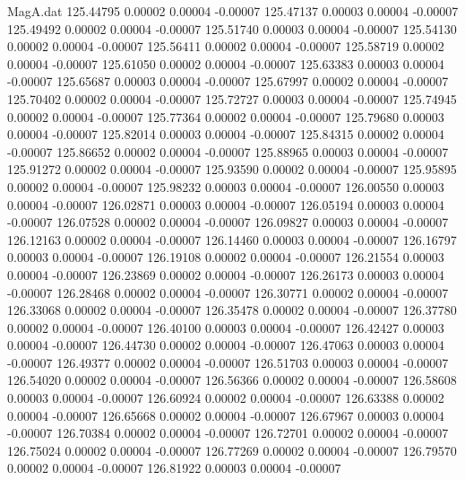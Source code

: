 \begin{filecontents}{MagA.dat}
 125.44795    0.00002    0.00004   -0.00007
 125.47137    0.00003    0.00004   -0.00007
 125.49492    0.00002    0.00004   -0.00007
 125.51740    0.00003    0.00004   -0.00007
 125.54130    0.00002    0.00004   -0.00007
 125.56411    0.00002    0.00004   -0.00007
 125.58719    0.00002    0.00004   -0.00007
 125.61050    0.00002    0.00004   -0.00007
 125.63383    0.00003    0.00004   -0.00007
 125.65687    0.00003    0.00004   -0.00007
 125.67997    0.00002    0.00004   -0.00007
 125.70402    0.00002    0.00004   -0.00007
 125.72727    0.00003    0.00004   -0.00007
 125.74945    0.00002    0.00004   -0.00007
 125.77364    0.00002    0.00004   -0.00007
 125.79680    0.00003    0.00004   -0.00007
 125.82014    0.00003    0.00004   -0.00007
 125.84315    0.00002    0.00004   -0.00007
 125.86652    0.00002    0.00004   -0.00007
 125.88965    0.00003    0.00004   -0.00007
 125.91272    0.00002    0.00004   -0.00007
 125.93590    0.00002    0.00004   -0.00007
 125.95895    0.00002    0.00004   -0.00007
 125.98232    0.00003    0.00004   -0.00007
 126.00550    0.00003    0.00004   -0.00007
 126.02871    0.00003    0.00004   -0.00007
 126.05194    0.00003    0.00004   -0.00007
 126.07528    0.00002    0.00004   -0.00007
 126.09827    0.00003    0.00004   -0.00007
 126.12163    0.00002    0.00004   -0.00007
 126.14460    0.00003    0.00004   -0.00007
 126.16797    0.00003    0.00004   -0.00007
 126.19108    0.00002    0.00004   -0.00007
 126.21554    0.00003    0.00004   -0.00007
 126.23869    0.00002    0.00004   -0.00007
 126.26173    0.00003    0.00004   -0.00007
 126.28468    0.00002    0.00004   -0.00007
 126.30771    0.00002    0.00004   -0.00007
 126.33068    0.00002    0.00004   -0.00007
 126.35478    0.00002    0.00004   -0.00007
 126.37780    0.00002    0.00004   -0.00007
 126.40100    0.00003    0.00004   -0.00007
 126.42427    0.00003    0.00004   -0.00007
 126.44730    0.00002    0.00004   -0.00007
 126.47063    0.00003    0.00004   -0.00007
 126.49377    0.00002    0.00004   -0.00007
 126.51703    0.00003    0.00004   -0.00007
 126.54020    0.00002    0.00004   -0.00007
 126.56366    0.00002    0.00004   -0.00007
 126.58608    0.00003    0.00004   -0.00007
 126.60924    0.00002    0.00004   -0.00007
 126.63388    0.00002    0.00004   -0.00007
 126.65668    0.00002    0.00004   -0.00007
 126.67967    0.00003    0.00004   -0.00007
 126.70384    0.00002    0.00004   -0.00007
 126.72701    0.00002    0.00004   -0.00007
 126.75024    0.00002    0.00004   -0.00007
 126.77269    0.00002    0.00004   -0.00007
 126.79570    0.00002    0.00004   -0.00007
 126.81922    0.00003    0.00004   -0.00007

\end{filecontents}
